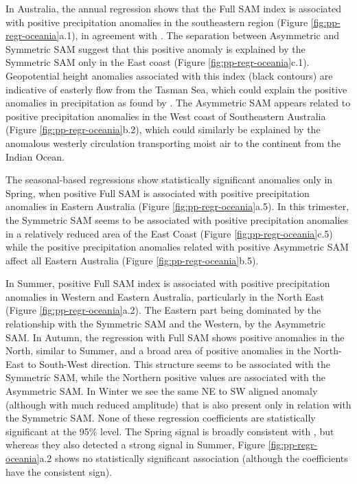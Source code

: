 \documentclass[smallextended]{svjour3}       %
\begin{document}
In Australia, the annual regression shows that the Full SAM index is associated with positive precipitation anomalies in the southeastern region (Figure \ref{fig:pp-regr-oceania}a.1), in agreement with \citet{gillett2006}. The separation between Asymmetric and Symmetric SAM suggest that this positive anomaly is explained by the Symmetric SAM only in the East coast (Figure \ref{fig:pp-regr-oceania}c.1). Geopotential height anomalies associated with this index (black contours) are indicative of easterly flow from the Tasman Sea, which could explain the positive anomalies in precipitation as found by \citet{hendon2007}. The Asymmetric SAM appears related to positive precipitation anomalies in the West coast of Southeastern Australia (Figure \ref{fig:pp-regr-oceania}b.2), which could similarly be explained by the anomalous westerly circulation transporting moist air to the continent from the Indian Ocean.

The seasonal-based regressions show statistically significant anomalies only in Spring, when positive Full SAM is associated with positive precipitation anomalies in Eastern Australia (Figure \ref{fig:pp-regr-oceania}a.5). In this trimester, the Symmetric SAM seems to be associated with positive precipitation anomalies in a relatively reduced area of the East Coast (Figure \ref{fig:pp-regr-oceania}c.5) while the positive precipitation anomalies related with positive Asymmetric SAM affect all Eastern Australia (Figure \ref{fig:pp-regr-oceania}b.5).

In Summer, positive Full SAM index is associated with positive precipitation anomalies in Western and Eastern Australia, particularly in the North East (Figure \ref{fig:pp-regr-oceania}a.2). The Eastern part being dominated by the relationship with the Symmetric SAM and the Western, by the Asymmetric SAM. In Autumn, the regression with Full SAM shows positive anomalies in the North, similar to Summer, and a broad area of positive anomalies in the North-East to South-West direction. This structure seems to be associated with the Symmetric SAM, while the Northern positive values are associated with the Asymmetric SAM. In Winter we see the same NE to SW aligned anomaly (although with much reduced amplitude) that is also present only in relation with the Symmetric SAM. None of these regression coefficients are statistically significant at the 95\% level. The Spring signal is broadly consistent with \citet{hendon2007}, but whereas they also detected a strong signal in Summer, Figure \ref{fig:pp-regr-oceania}a.2 shows no statistically significant association (although the coefficients have the consistent sign).
\end{document}
